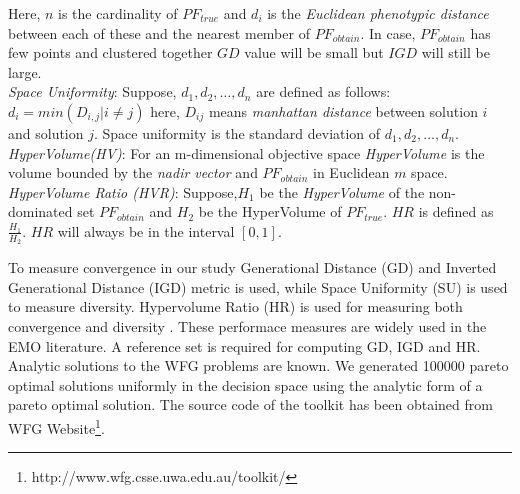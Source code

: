 \documentclass[journal]{IEEEtran}
\begin{document}
Here, $n$ is the cardinality of $PF_{true}$ and $d_i$ is the \textit{Euclidean phenotypic distance} between each of these and the nearest member of $PF_{obtain}$. In case, $PF_{obtain}$ has few points and clustered together $GD$ value will be small but $IGD$ will still be large.\\

\textit{Space Uniformity}:
Suppose, $d_1,d_2,\dots,d_n$ are defined as follows:
$d_i = min ( D_{i,j} | i\neq j)$
here, $D_{ij}$ means \textit{manhattan distance} between solution $i$ and solution $j$. Space uniformity is the standard deviation of $d_1,d_2,\dots,d_n$.\\

\textit{HyperVolume(HV)}:
For an m-dimensional objective space \textit{HyperVolume} is the volume bounded by the \textit{nadir vector} and $PF_{obtain}$ in Euclidean $m$ space.\\

\textit{HyperVolume Ratio (HVR)}:
Suppose,$H_1$ be the \textit{HyperVolume} of the non-dominated set $PF_{obtain}$ and $H_2$ be the HyperVolume of $PF_{true}$. $HR$ is defined as $\frac{H_1}{H_2}$. $HR$ will always be in the interval $[0,1]$.

To measure convergence in our study Generational Distance (GD) and Inverted Generational Distance (IGD) metric is used, while Space Uniformity (SU) is used to measure diversity. Hypervolume Ratio (HR) is used for measuring both convergence and diversity \cite{coello2002evolutionary}. These performace measures are widely used in the EMO literature. A reference set is required for computing GD, IGD and HR. Analytic solutions to the WFG problems are known. We generated 100000 pareto optimal solutions uniformly in the decision space using the analytic form of a pareto optimal solution. The source code of the toolkit has been obtained from WFG Website\footnote{http://www.wfg.csse.uwa.edu.au/toolkit/}.
\end{document}
